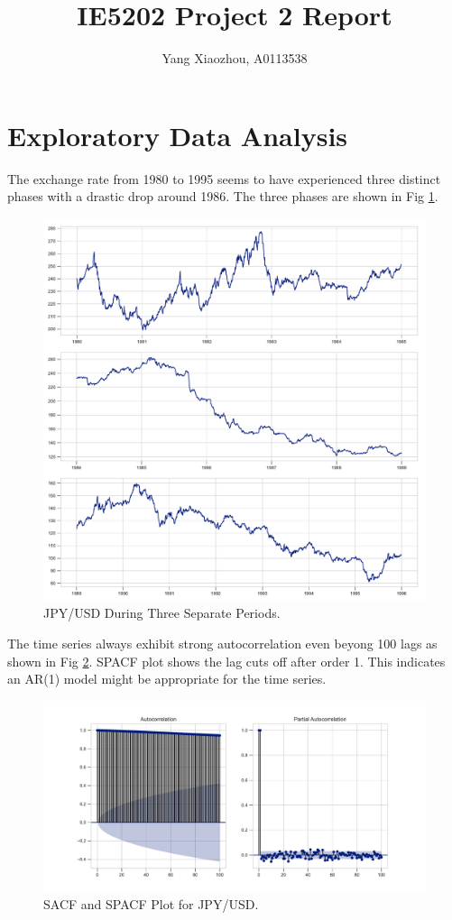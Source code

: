 \documentclass[]{article}
\title{IE5202 Project 2 Report}
\author{Yang Xiaozhou, A0113538}
\begin{document}
\maketitle

\section{Exploratory Data Analysis}

The exchange rate from 1980 to 1995 seems to have experienced three distinct phases with a drastic drop around 1986. The three phases are shown in Fig \ref{fig:jpy_usd_three_peridos}.
%
\begin{figure}[hbtp]
	\centering
	\includegraphics[width=1\columnwidth]{../Figures/jpy_usd_three_periods.pdf}
	\caption{JPY/USD During Three Separate Periods.}
	\label{fig:jpy_usd_three_peridos}
\end{figure}
%
The time series always exhibit strong autocorrelation even beyong 100 lags as shown in Fig \ref{fig:sacf_n_spacf_plot}. SPACF plot shows the lag cuts off after order 1. This indicates an AR(1) model might be appropriate for the time series. 
%
\begin{figure}[hbtp]
	\centering
	\includegraphics[width=1\columnwidth]{../Figures/sacf_n_spacf_plot.pdf}
	\caption{SACF and SPACF Plot for JPY/USD.}
	\label{fig:sacf_n_spacf_plot}
\end{figure}
\end{document}
